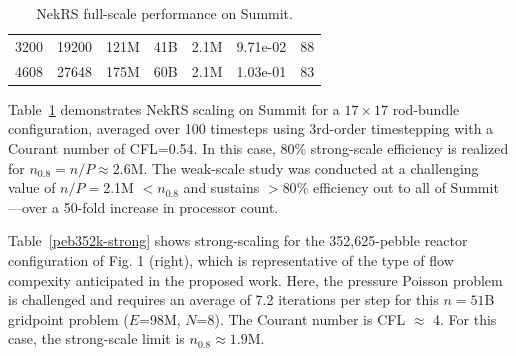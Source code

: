 \begin{table}[b]
\begin{tabular}{|c|c|c|c|c|c|r|}
 3200 & 19200 & 121M      & 41B   &  2.1M  & 9.71e-02  & 88    \\%
 4608 & 27648 & 175M      & 60B   &  2.1M  & 1.03e-01  & 83    \\%
 \hline
 \end{tabular}
 \caption{\small\label{rod-strong-weak} NekRS full-scale performance on Summit.}
\end{table}

Table~\ref{rod-strong-weak} demonstrates NekRS scaling on Summit for a
$17 \times 17$ rod-bundle configuration, averaged over 100 timesteps
using 3rd-order timestepping with a Courant number of CFL=0.54.
In this case, 80\% strong-scale efficiency is realized for
$n_{0.8} = n/P \approx 2.6$M.  The weak-scale study was conducted at a
challenging value of $n/P = $2.1M $< n_{0.8}$ and sustains $> 80\%$
efficiency out to all of Summit---over a 50-fold increase in processor count.

Table~\ref{peb352k-strong} shows strong-scaling for the 352,625-pebble reactor
configuration of Fig. 1 (right), which is representative of the type of flow
compexity anticipated in the proposed work.  Here, the pressure Poisson
problem is challenged and requires an average of 7.2 iterations per step
for this $n=51$B gridpoint problem ($E$=98M, $N$=8).  The Courant number
is CFL $\approx$ 4.  For this case, the strong-scale limit is $n_{0.8}\approx 1.9$M.


